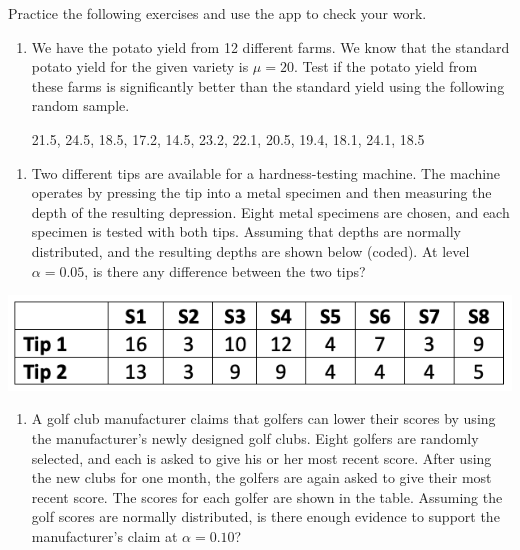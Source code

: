 \documentclass[
]{book}
\providecommand{\tightlist}{%
  \setlength{\itemsep}{0pt}\setlength{\parskip}{0pt}}
\begin{document}
Practice the following exercises and use the app to check your work.

\begin{enumerate}
\def\labelenumi{\arabic{enumi}.}
\item
  We have the potato yield from 12 different farms. We know that the standard potato yield for the given variety is \(\mu=20\). Test if the potato yield from these farms is significantly better than the standard yield using the following random sample.

  21.5, 24.5, 18.5, 17.2, 14.5, 23.2, 22.1, 20.5, 19.4, 18.1, 24.1, 18.5
\end{enumerate}

\hfill\break

\begin{enumerate}
\def\labelenumi{\arabic{enumi}.}
\setcounter{enumi}{1}
\tightlist
\item
  Two different tips are available for a hardness-testing machine. The machine operates by pressing the tip into a metal specimen and then measuring the depth of the resulting depression. Eight metal specimens are chosen, and each specimen is tested with both tips. Assuming that depths are normally distributed, and the resulting depths are shown below (coded). At level \(\alpha = 0.05\), is there any difference between the two tips?
\end{enumerate}

\begin{center}\includegraphics[width=0.5\linewidth]{week10/ex01Data} \end{center}

\hfill\break

\begin{enumerate}
\def\labelenumi{\arabic{enumi}.}
\setcounter{enumi}{2}
\tightlist
\item
  A golf club manufacturer claims that golfers can lower their scores by using the manufacturer's newly designed golf clubs. Eight golfers are randomly selected, and each is asked to give his or her most recent score. After using the new clubs for one month, the golfers are again asked to give their most recent score. The scores for each golfer are shown in the table. Assuming the golf scores are normally distributed, is there enough evidence to support the manufacturer's claim at \(\alpha = 0.10\)?
\end{enumerate}
\end{document}
